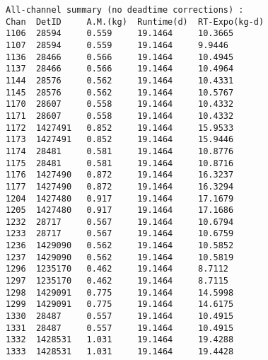 \documentclass[notitlepage,rmp,aps,10pt]{revtex4-1}
\begin{document}
\begin{verbatim}
All-channel summary (no deadtime corrections) :
Chan  DetID     A.M.(kg)  Runtime(d)  RT-Expo(kg-d)
1106  28594     0.559     19.1464     10.3665
1107  28594     0.559     19.1464     9.9446
1136  28466     0.566     19.1464     10.4945
1137  28466     0.566     19.1464     10.4964
1144  28576     0.562     19.1464     10.4331
1145  28576     0.562     19.1464     10.5767
1170  28607     0.558     19.1464     10.4332
1171  28607     0.558     19.1464     10.4332
1172  1427491   0.852     19.1464     15.9533
1173  1427491   0.852     19.1464     15.9446
1174  28481     0.581     19.1464     10.8776
1175  28481     0.581     19.1464     10.8716
1176  1427490   0.872     19.1464     16.3237
1177  1427490   0.872     19.1464     16.3294
1204  1427480   0.917     19.1464     17.1679
1205  1427480   0.917     19.1464     17.1686
1232  28717     0.567     19.1464     10.6794
1233  28717     0.567     19.1464     10.6759
1236  1429090   0.562     19.1464     10.5852
1237  1429090   0.562     19.1464     10.5819
1296  1235170   0.462     19.1464     8.7112
1297  1235170   0.462     19.1464     8.7115
1298  1429091   0.775     19.1464     14.5998
1299  1429091   0.775     19.1464     14.6175
1330  28487     0.557     19.1464     10.4915
1331  28487     0.557     19.1464     10.4915
1332  1428531   1.031     19.1464     19.4288
1333  1428531   1.031     19.1464     19.4428
\end{verbatim}



\newpage
\end{document}
